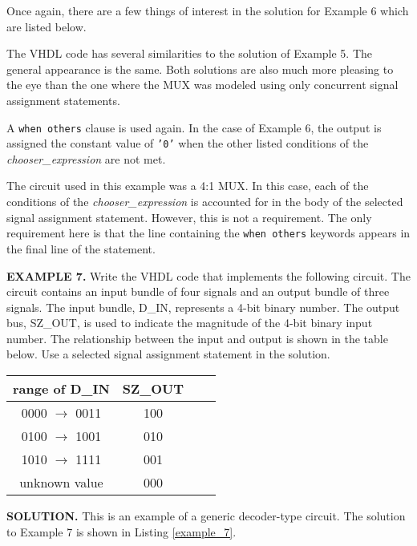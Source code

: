 Once again, there are a few things of interest in the solution for Example 6 which are listed below.
\begin{my_list}
\item The VHDL code has several similarities to the solution of Example 5. The general appearance is the same. Both solutions are also much more pleasing to the eye than the one where the MUX was modeled using only concurrent signal assignment statements.
\item A \texttt{when others} clause is used again. In the case of Example 6, the output is assigned the constant value of \texttt{'0'} when the other listed conditions of the \textit{chooser\_expression} are not met.
\item The circuit used in this example was a 4:1 MUX. In this case, each of the conditions of the \textit{chooser\_expression} is accounted for in the body of the selected signal assignment statement. However, this is not a requirement. The only requirement here is that the line containing the \texttt{when others} keywords appears in the final line of the statement.
\end{my_list}

\begin{leftbar}
\noindent
\textbf{EXAMPLE 7.} Write the VHDL code that implements the following circuit. The circuit contains an input bundle of four signals and an output bundle of three signals. The input bundle, D\_IN, represents a 4-bit binary number. The output bus, SZ\_OUT, is used to indicate the magnitude of the 4-bit binary input number. The relationship between the input and output is shown in the table below. Use a selected signal assignment statement in the solution.

\centering\vspace{5pt}
\begin{tabular}{c*{2}{c}r}
range of D\_IN  & SZ\_OUT \\
\hline
0000 $\rightarrow$ 0011 & 100 \\
0100 $\rightarrow$ 1001 & 010 \\
1010 $\rightarrow$ 1111 & 001 \\
unknown value		& 000 \\
\end{tabular}
\end{leftbar}
\noindent
\textbf{SOLUTION.} This is an example of a generic decoder-type circuit. The solution to Example 7 is shown in Listing \ref{example_7}.

\noindent
\begin{minipage}{0.99\linewidth}
\centering
{}
\end{minipage}

